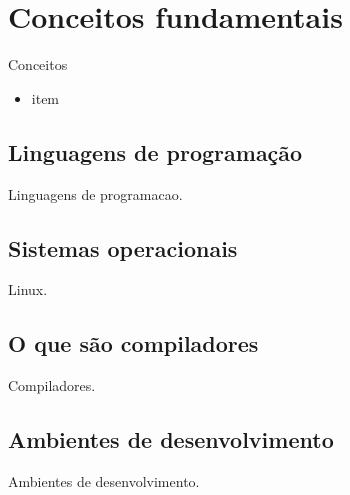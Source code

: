 

\chapter{Conceitos fundamentais}
Conceitos

\begin{itemize}
  \item item
\end{itemize}

\section{Linguagens de programação}

Linguagens de programacao.


\section{Sistemas operacionais}

Linux.


\section{O que são compiladores}

Compiladores.


\section{Ambientes de desenvolvimento}

Ambientes de desenvolvimento.


